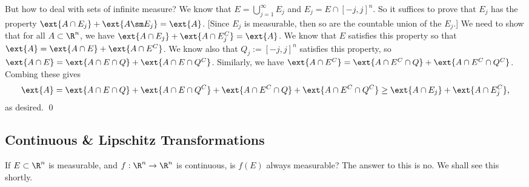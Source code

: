But how to deal with sets of infinite measure? We know that $E= \bigcup_{j=1}^\infty E_j$ and $E_j= E \cap [-j,j]^n$. So it suffices to prove that $E_j$ has the property $\ext{A \cap E_j}+\ext{A\sm E_j}=\ext{A}$. [Since $E_j$ is measurable, then so are the countable union of the $E_j$.] We need to show that for all $A \subset \R^n$, we have $\ext{A \cap E_j} + \ext{A \cap E_j^C}=\ext{A}$. We know that $E$ satisfies this property so that $\ext{A}= \ext{A \cap E} + \ext{A \cap E^C}$. We know also that $Q_j:= [-j,j]^n$ satisfies this property, so $\ext{A \cap E}= \ext{A \cap E \cap Q}+ \ext{A \cap E \cap Q^C}$. Similarly, we have $\ext{A \cap E^C}= \ext{A \cap E^C \cap Q}+ \ext{A \cap E^C \cap Q^C}$. Combing these gives
	\[
	\ext{A}= \ext{A \cap E \cap Q} + \ext{A \cap E \cap Q^C} + \ext{A \cap E^C \cap Q}+ \ext{A \cap E^C \cap Q^C} \geq \ext{A \cap E_j} + \ext{A \cap E_j^C},
	\]
as desired. \qed \\















\subsection{Continuous \& Lipschitz Transformations}

If $E \subset \R^n$ is measurable, and $f: \R^n \to \R^n$ is continuous, is $f(E)$ always measurable? The answer to this is no. We shall see this shortly. 


